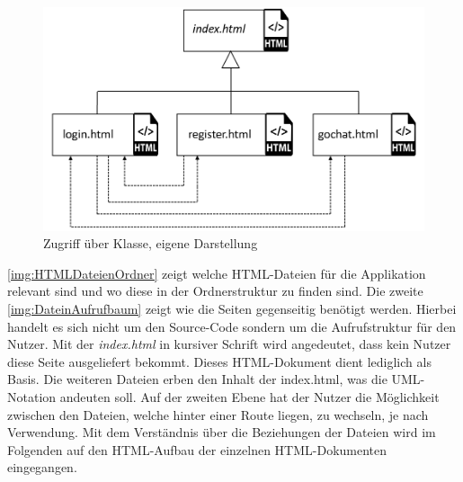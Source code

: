 \documentclass[a4paper,titlepage,halfparskip,12pt]{scrreprt}
\begin{document}
\begin{onehalfspacing}
\begin{figure}[h]
\begin{minipage}[c]{.4\textwidth}
		\includegraphics[scale=0.7]{images/HTMLDateienAufrufbaum}
		\caption{Zugriff über Klasse, eigene Darstellung}
		\label{img:DateinAufrufbaum}
	\end{minipage}
\end{figure}
\autoref{img:HTMLDateienOrdner} zeigt welche HTML-Dateien für die Applikation relevant sind und wo diese in der Ordnerstruktur zu finden sind. Die zweite \autoref{img:DateinAufrufbaum} zeigt wie die Seiten gegenseitig benötigt werden. Hierbei handelt es sich nicht um den Source-Code sondern um die Aufrufstruktur für den Nutzer. Mit der \textit{index.html} in kursiver Schrift wird angedeutet, dass kein Nutzer diese Seite ausgeliefert bekommt. Dieses \ac{HTML}-Dokument dient lediglich als Basis. Die weiteren Dateien erben den Inhalt der index.html, was die UML-Notation andeuten soll. Auf der zweiten Ebene hat der Nutzer die Möglichkeit zwischen den Dateien, welche hinter einer Route liegen, zu wechseln, je nach Verwendung. Mit dem Verständnis über die Beziehungen der Dateien wird im Folgenden auf den \ac{HTML}-Aufbau der einzelnen HTML-Dokumenten eingegangen.



\end{onehalfspacing}
\end{document}
